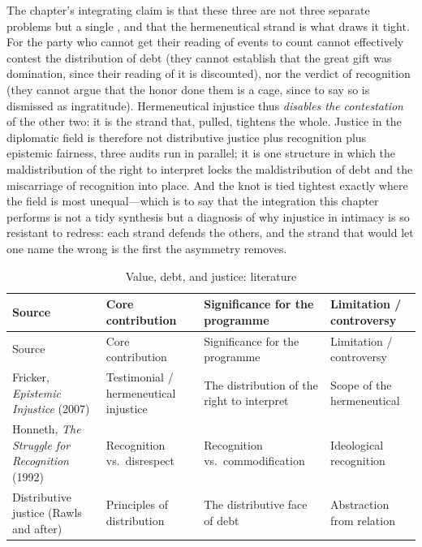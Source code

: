 The chapter's integrating claim is that these three are not three separate problems but a single , and that the hermeneutical strand is what draws it tight. For the party who cannot get their reading of events to count cannot effectively contest the distribution of debt (they cannot establish that the great gift was domination, since their reading of it is discounted), nor the verdict of recognition (they cannot argue that the honor done them is a cage, since to say so is dismissed as ingratitude). Hermeneutical injustice thus \emph{disables the contestation} of the other two: it is the strand that, pulled, tightens the whole. Justice in the diplomatic field is therefore not distributive justice plus recognition plus epistemic fairness, three audits run in parallel; it is one structure in which the maldistribution of the right to interpret locks the maldistribution of debt and the miscarriage of recognition into place. And the knot is tied tightest exactly where the field is most unequal---which is to say that the integration this chapter performs is not a tidy synthesis but a diagnosis of why injustice in intimacy is so resistant to redress: each strand defends the others, and the strand that would let one name the wrong is the first the asymmetry removes.

\goldrule
\footnotesize
\begin{longtable}{Y Y Y Y}
\caption{Value, debt, and justice: literature}\label{p07:tab:justice}\\
\toprule
{}
Source & Core contribution & Significance for the programme & Limitation / controversy \\
\midrule
\endfirsthead
\toprule
{}
Source & Core contribution & Significance for the programme & Limitation / controversy \\
\midrule
\endhead
Fricker, \emph{Epistemic Injustice} (2007) & Testimonial / hermeneutical injustice & The distribution of the right to interpret & Scope of the hermeneutical \\
Honneth, \emph{The Struggle for Recognition} (1992) & Recognition vs.\ disrespect & Recognition vs.\ commodification & Ideological recognition \\
Distributive justice (Rawls and after) & Principles of distribution & The distributive face of debt & Abstraction from relation \\
\bottomrule
\end{longtable}

